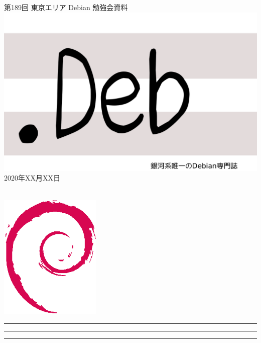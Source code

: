 \documentclass[mingoth,a4paper]{jsarticle}
\newcommand{\debmtgyear}{2020}
\newcommand{\debmtgmonth}{XX}
\newcommand{\debmtgdate}{XX}
\newcommand{\debmtgnumber}{189}
\begin{document}
\begin{titlepage}
\thispagestyle{empty}

\vspace*{-2cm}
第\debmtgnumber{}回 東京エリア Debian 勉強会資料\\
\hspace*{-2cm}
\includegraphics{image2012-natsu/dotdeb.pdf}\\
\hfill{}\debmtgyear{}年\debmtgmonth{}月\debmtgdate{}日

\\

\vspace*{-2cm}
\hfill{}\includegraphics[height=6cm]{image200502/openlogo-nd.eps}
\end{titlepage}

\newpage

\begin{minipage}[b]{0.2\hsize}
 \colorbox{titleback}{}
\end{minipage}
\begin{minipage}[b]{0.8\hsize}
\hrule
\vspace{2mm}
\hrule
\begin{multicols}{2}
\tableofcontents
\end{multicols}
\vspace{2mm}
\hrule
\end{minipage}
\end{document}
